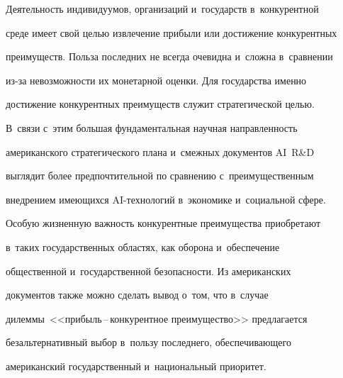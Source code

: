   Деятельность индивидуумов, организаций и~государств в~конкурентной


среде имеет свой целью извлечение прибыли или достижение конкурентных


преимуществ. Польза последних не всегда очевидна и~сложна в~сравнении


из-за невозможности их монетарной оценки. Для государства именно


достижение конкурентных преимуществ служит стратегической целью.


В~связи с~этим большая фундаментальная научная направленность


американского стратегического плана и~смеж\-ных документов AI~R\&D


выглядит более предпочтительной по сравнению с~преимущественным


внедрением имеющихся AI-технологий в~экономике и~социальной сфере.


Особую жизненную важность конкурентные преимущества приобретают


в~таких государственных областях, как оборона и~обеспечение


общественной и~государственной безопас\-ности. Из американских


документов также можно сделать вывод о~том, что в~случае


дилеммы~<<при\-быль\,--\,кон\-ку\-рент\-ное преимущество>> предлагается


безальтернативный выбор в~пользу последнего, обес\-пе\-чи\-ва\-юще\-го


американский государственный и~национальный приоритет.





